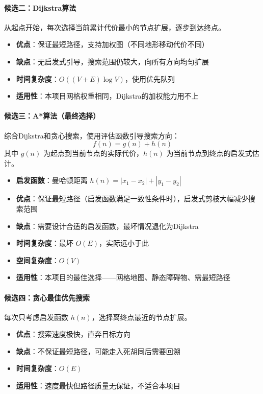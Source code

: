 \documentclass[12pt,a4paper]{article}
\begin{document}
\paragraph{候选二：Dijkstra算法}

从起点开始，每次选择当前累计代价最小的节点扩展，逐步到达终点。

\begin{itemize}[leftmargin=2em]
    \item \textbf{优点}：保证最短路径，支持加权图（不同地形移动代价不同）
    \item \textbf{缺点}：无启发式引导，搜索范围仍较大，向所有方向均匀扩展
    \item \textbf{时间复杂度}：$O((V + E) \log V)$，使用优先队列
    \item \textbf{适用性}：本项目网格权重相同，Dijkstra的加权能力用不上
\end{itemize}

\paragraph{候选三：A*算法（最终选择）}

综合Dijkstra和贪心搜索，使用评估函数引导搜索方向：
\[f(n) = g(n) + h(n)\]
其中 $g(n)$ 为起点到当前节点的实际代价，$h(n)$ 为当前节点到终点的启发式估计。

\begin{itemize}[leftmargin=2em]
    \item \textbf{启发函数}：曼哈顿距离 $h(n) = |x_1 - x_2| + |y_1 - y_2|$
    \item \textbf{优点}：保证最短路径（启发函数满足一致性条件时），启发式剪枝大幅减少搜索范围
    \item \textbf{缺点}：需要设计合适的启发函数，最坏情况退化为Dijkstra
    \item \textbf{时间复杂度}：最坏 $O(E)$，实际远小于此
    \item \textbf{空间复杂度}：$O(V)$
    \item \textbf{适用性}：本项目的最佳选择——网格地图、静态障碍物、需最短路径
\end{itemize}

\paragraph{候选四：贪心最佳优先搜索}

每次只考虑启发函数 $h(n)$，选择离终点最近的节点扩展。

\begin{itemize}[leftmargin=2em]
    \item \textbf{优点}：搜索速度极快，直奔目标方向
    \item \textbf{缺点}：不保证最短路径，可能走入死胡同后需要回溯
    \item \textbf{时间复杂度}：$O(E)$
    \item \textbf{适用性}：速度最快但路径质量无保证，不适合本项目
\end{itemize}
\end{document}
